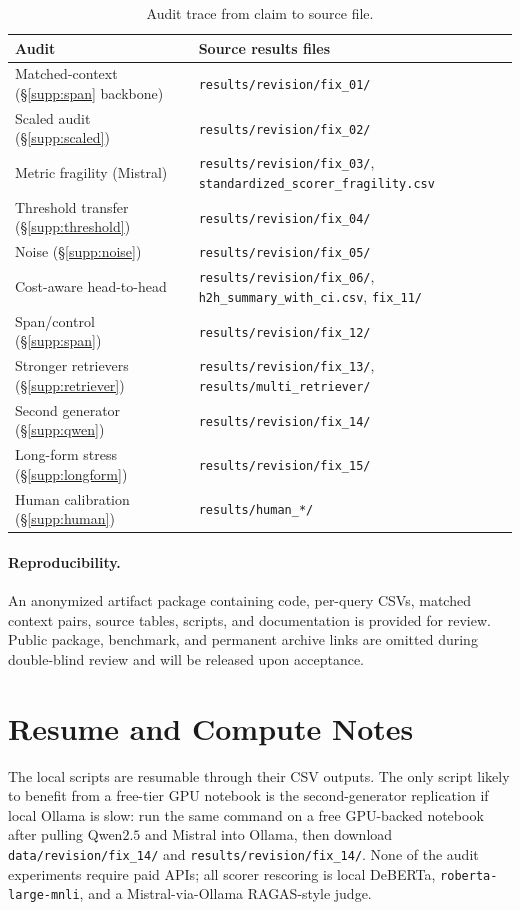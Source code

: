 \documentclass[11pt]{article}
\begin{document}
\begin{table}[!htb]
\centering
\caption{Audit trace from claim to source file.}
\label{tab:supp:trace}
\footnotesize
\begin{tabular}{ll}
\toprule
Audit & Source results files \\
\midrule
Matched-context (\S\ref{supp:span} backbone) &
  \texttt{results/revision/fix\_01/} \\
Scaled audit (\S\ref{supp:scaled}) &
  \texttt{results/revision/fix\_02/} \\
Metric fragility (Mistral) &
  \texttt{results/revision/fix\_03/}, \texttt{standardized\_scorer\_fragility.csv} \\
Threshold transfer (\S\ref{supp:threshold}) &
  \texttt{results/revision/fix\_04/} \\
Noise (\S\ref{supp:noise}) &
  \texttt{results/revision/fix\_05/} \\
Cost-aware head-to-head &
  \texttt{results/revision/fix\_06/}, \texttt{h2h\_summary\_with\_ci.csv}, \texttt{fix\_11/} \\
Span/control (\S\ref{supp:span}) &
  \texttt{results/revision/fix\_12/} \\
Stronger retrievers (\S\ref{supp:retriever}) &
  \texttt{results/revision/fix\_13/}, \texttt{results/multi\_retriever/} \\
Second generator (\S\ref{supp:qwen}) &
  \texttt{results/revision/fix\_14/} \\
Long-form stress (\S\ref{supp:longform}) &
  \texttt{results/revision/fix\_15/} \\
Human calibration (\S\ref{supp:human}) &
  \texttt{results/human\_*/} \\
\bottomrule
\end{tabular}
\end{table}

\paragraph{Reproducibility.} An anonymized artifact package containing
code, per-query CSVs, matched context pairs, source tables, scripts, and
documentation is provided for review. Public package, benchmark, and
permanent archive links are omitted during double-blind review and will
be released upon acceptance.

\section{Resume and Compute Notes}
\label{supp:kaggle}

The local scripts are resumable through their CSV outputs. The only
script likely to benefit from a free-tier GPU notebook is the
second-generator replication if local Ollama is slow: run the same
command on a free GPU-backed notebook after pulling Qwen$2.5$ and
Mistral into Ollama, then download \texttt{data/revision/fix\_14/} and
\texttt{results/revision/fix\_14/}. None of the audit experiments
require paid APIs; all scorer rescoring is local DeBERTa,
\texttt{roberta-large-mnli}, and a Mistral-via-Ollama RAGAS-style
judge.



\end{document}
